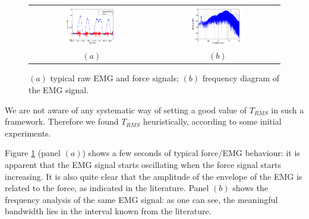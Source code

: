 \begin{figure}[!ht] \centering
  \begin{tabular}{cc}
    \includegraphics[width=0.45\textwidth]{figs/force_raw} &
    \includegraphics[width=0.45\textwidth]{figs/spectrum_raw} \\
    $(a)$ & $(b)$ \\
  \end{tabular}
  \caption{$(a)$ typical raw EMG and force signals; $(b)$ frequency diagram of
    the EMG signal.}
  \label{fig:spectra}
\end{figure}


We are not aware of any systematic way of setting a good value of
$T_{RMS}$ in such a framework. Therefore we found $T_{RMS}$
heuristically, according to some initial experiments.

Figure \ref{fig:spectra} (panel $(a)$) shows a few seconds of typical
force/EMG behaviour: it is apparent that the EMG signal starts oscillating when the force signal
starts increasing. It is also quite clear that the
amplitude of the envelope of the EMG is related to the force, as
indicated in the literature. Panel $(b)$ shows the frequency analysis
of the same EMG signal: as one can see, the meaningful bandwidth lies
in the interval known from the literature.

